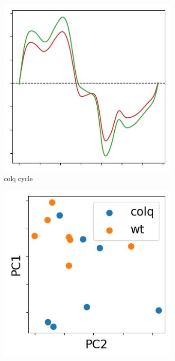 \vspace{-1ex}
\begin{figure}[t]
  \centering
  \begin{subfigure}[b]{0.15\textwidth}
    \centering
    \includegraphics[width = \textwidth]{pictures/exp_1_cycle_example.jpeg}
    \caption{colq cycle}
    \label{fig:colq-cycle}
  \end{subfigure}
  \begin{subfigure}[b]{0.15\textwidth}
    \centering
    \includegraphics[width = \textwidth]{pictures/exp_1_scatter.jpeg}

\end{subfigure}
\end{figure}
